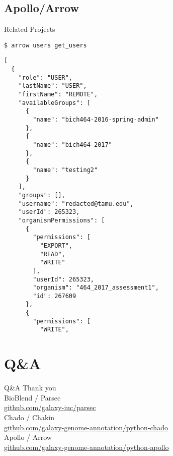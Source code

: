 \documentclass[12pt]{phage3slides} %
\begin{document}
\subsection{Apollo/Arrow}
\begin{frame}[fragile,t]{Related Projects}
\begin{verbatim}
$ arrow users get_users
\end{verbatim}
\begin{verbatim}
[
  {
    "role": "USER",
    "lastName": "USER",
    "firstName": "REMOTE",
    "availableGroups": [
      {
        "name": "bich464-2016-spring-admin"
      },
      {
        "name": "bich464-2017"
      },
      {
        "name": "testing2"
      }
    ],
    "groups": [],
    "username": "redacted@tamu.edu",
    "userId": 265323,
    "organismPermissions": [
      {
        "permissions": [
          "EXPORT",
          "READ",
          "WRITE"
        ],
        "userId": 265323,
        "organism": "464_2017_assessment1",
        "id": 267609
      },
      {
        "permissions": [
          "WRITE",
\end{verbatim}
\end{frame}


\section{Q\&A}
\begin{frame}{Q\&A}
	Thank you\\[1em]
\small
BioBlend / Parsec \\
\url{github.com/galaxy-iuc/parsec} \\[.5em]
Chado / Chakin \\
\url{github.com/galaxy-genome-annotation/python-chado} \\[.5em]
Apollo / Arrow \\
\url{github.com/galaxy-genome-annotation/python-apollo}\\[.5em]

	\begin{center}
		\informationErascheTable\\
		\fundingNSFABIannotation%
	\end{center}
\end{frame}
\end{document}
